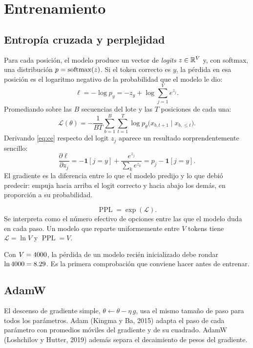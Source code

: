 \documentclass[11pt,letterpaper,oneside]{report}
\begin{document}
\section{Entrenamiento}\label{sec:entrenamiento}

\subsection{Entropía cruzada y perplejidad}

Para cada posición, el modelo produce un vector de \emph{logits} $z\in\mathbb{R}^V$ y, con softmax, una distribución $p = \operatorname{softmax}(z)$. Si el token correcto es $y$, la pérdida en esa posición es el logaritmo negativo de la probabilidad que el modelo le dio:
\begin{equation}\label{eq:ce}
  \ell = -\log p_y = -z_y + \log\sum_{j=1}^{V} e^{z_j}.
\end{equation}
Promediando sobre las $B$ secuencias del lote y las $T$ posiciones de cada una:
\[
  \mathcal{L}(\theta) = -\frac{1}{BT}\sum_{b=1}^{B}\sum_{t=1}^{T} \log p_\theta\big(x_{b,t+1}\mid x_{b,\le t}\big).
\]
Derivando \eqref{eq:ce} respecto del logit $z_j$ aparece un resultado sorprendentemente sencillo:
\[
  \frac{\partial \ell}{\partial z_j} = -\mathbf{1}[j = y] + \frac{e^{z_j}}{\sum_k e^{z_k}} = p_j - \mathbf{1}[j=y].
\]
El gradiente es la diferencia entre lo que el modelo predijo y lo que debió predecir: empuja hacia arriba el logit correcto y hacia abajo los demás, en proporción a su probabilidad.

\begin{definicion}[Perplejidad]
\[
  \operatorname{PPL} = \exp(\mathcal{L}).
\]
Se interpreta como el número efectivo de opciones entre las que el modelo duda en cada paso. Un modelo que reparte uniformemente entre $V$ tokens tiene $\mathcal{L} = \ln V$ y $\operatorname{PPL} = V$.
\end{definicion}

Con $V = 4000$, la pérdida de un modelo recién inicializado debe rondar $\ln 4000 = 8.29$. Es la primera comprobación que conviene hacer antes de entrenar.

\subsection{AdamW}

El descenso de gradiente simple, $\theta \leftarrow \theta - \eta\,g$, usa el mismo tamaño de paso para todos los parámetros. Adam (Kingma y Ba, 2015) adapta el paso de cada parámetro con promedios móviles del gradiente y de su cuadrado. AdamW (Loshchilov y Hutter, 2019) además separa el decaimiento de pesos del gradiente.
\end{document}
